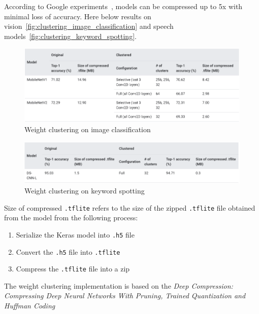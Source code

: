 According to Google experiments~\cite{tfmot:clustering}, models can be
compressed up to 5x with minimal loss of accuracy. Here below results on
vision~\autoref{fig:clustering_image_classification} and speech
models~\autoref{fig:clustering_keyword_spotting}.

\begin{figure}[ht]
    \includegraphics[width=\textwidth]{images/introduction/clustering_image_classification.png}
    \centering
    \caption{Weight clustering on image classification}\label{fig:clustering_image_classification}
\end{figure}

\begin{figure}[ht]
    \includegraphics[width=\textwidth]{images/introduction/clustering_keyword_spotting.png}
    \centering
    \caption{Weight clustering on keyword spotting}\label{fig:clustering_keyword_spotting}
\end{figure}

Size of compressed \texttt{.tflite} refers to the size of the zipped
\texttt{.tflite} file obtained from the model from the following process:

\begin{enumerate}
    \item Serialize the Keras model into \texttt{.h5} file
    \item Convert the \texttt{.h5} file into \texttt{.tflite}
    \item Compress the \texttt{.tflite} file into a zip
\end{enumerate}

The weight clustering implementation is based on the \textit{Deep Compression:
Compressing Deep Neural Networks With Pruning, Trained Quantization and Huffman
Coding}~\cite{han2015deep}~\cite{tfmot:clustering}

